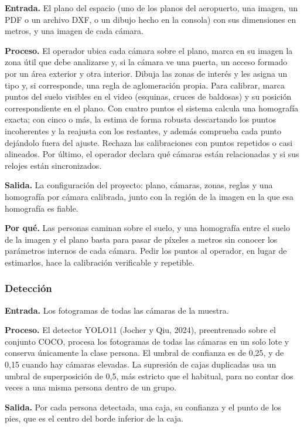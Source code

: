 \textbf{Entrada.} El plano del espacio (uno de los planos del aeropuerto, una imagen, un PDF o
un archivo DXF, o un dibujo hecho en la consola) con sus dimensiones en metros, y una imagen
de cada cámara.

\textbf{Proceso.} El operador ubica cada cámara sobre el plano, marca en su imagen la zona útil
que debe analizarse y, si la cámara ve una puerta, un acceso formado por un área exterior y otra
interior. Dibuja las zonas de interés y les asigna un tipo y, si corresponde, una regla de
aglomeración propia. Para calibrar, marca puntos del suelo visibles en el video (esquinas,
cruces de baldosas) y su posición correspondiente en el plano. Con cuatro puntos el sistema
calcula una homografía exacta; con cinco o más, la estima de forma robusta descartando los
puntos incoherentes y la reajusta con los restantes, y además comprueba cada punto dejándolo
fuera del ajuste. Rechaza las calibraciones con puntos repetidos o casi alineados. Por último, el
operador declara qué cámaras están relacionadas y si sus relojes están sincronizados.

\textbf{Salida.} La configuración del proyecto: plano, cámaras, zonas, reglas y una homografía
por cámara calibrada, junto con la región de la imagen en la que esa homografía es fiable.

\textbf{Por qué.} Las personas caminan sobre el suelo, y una homografía entre el suelo de la
imagen y el plano basta para pasar de píxeles a metros sin conocer los parámetros internos de
cada cámara. Pedir los puntos al operador, en lugar de estimarlos, hace la calibración
verificable y repetible.

\subsubsection{Detección}
\label{subsec:met-deteccion}

\textbf{Entrada.} Los fotogramas de todas las cámaras de la muestra.

\textbf{Proceso.} El detector YOLO11 (Jocher y Qiu, 2024), preentrenado sobre el conjunto
COCO, procesa los fotogramas de todas las cámaras en un solo lote y conserva únicamente la
clase persona. El umbral de confianza es de 0,25, y de 0,15 cuando hay cámaras elevadas. La
supresión de cajas duplicadas usa un umbral de superposición de 0,5, más estricto que el
habitual, para no contar dos veces a una misma persona dentro de un grupo.

\textbf{Salida.} Por cada persona detectada, una caja, su confianza y el punto de los pies, que
es el centro del borde inferior de la caja.

